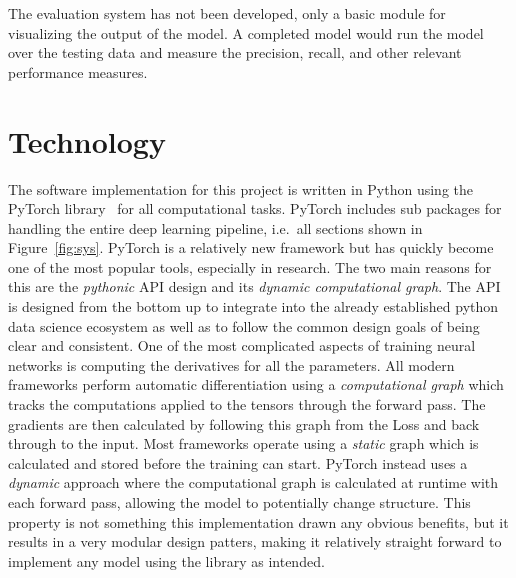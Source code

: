 The evaluation system has not been developed, only a basic module for visualizing the output of the model.
A completed model would run the model over the testing data and measure the precision, recall, and other relevant performance measures.


\section*{Technology}

The software implementation for this project is written in Python using the PyTorch library~\parencite{NEURIPS2019_9015} for all computational tasks.
PyTorch includes sub packages for handling the entire deep learning pipeline, i.e.~all sections shown in Figure~\ref{fig:sys}.
PyTorch is a relatively new framework but has quickly become one of the most popular tools, especially in research.
The two main reasons for this are the \textit{pythonic} API design and its \textit{dynamic computational graph}.
The API is designed from the bottom up to integrate into the already established python data science ecosystem as well as to follow the common design goals of being clear and consistent.
One of the most complicated aspects of training neural networks is computing the derivatives for all the parameters.
All modern frameworks perform automatic differentiation using a \textit{computational graph} which tracks the computations applied to the tensors through the forward pass.
The gradients are then calculated by following this graph from the Loss and back through to the input.
Most frameworks operate using a \textit{static} graph which is calculated and stored before the training can start.
PyTorch instead uses a \textit{dynamic} approach where the computational graph is calculated at runtime with each forward pass, allowing the model to potentially change structure.
This property is not something this implementation drawn any obvious benefits, but it results in a very modular design patters, making it relatively straight forward to implement any model using the library as intended.  


